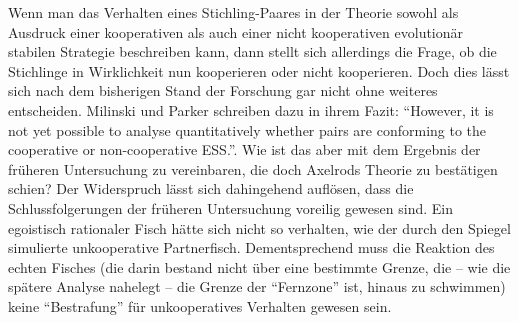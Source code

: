 \documentclass[12pt,a4paper,ngerman]{article}
\begin{document}
Wenn man das Verhalten eines Stichling-Paares in der Theorie sowohl
als Ausdruck einer kooperativen als auch einer nicht kooperativen
evolutionär stabilen Strategie beschreiben kann, dann stellt sich
allerdings die Frage, ob die Stichlinge in Wirklichkeit nun
kooperieren oder nicht kooperieren. Doch dies lässt sich nach dem
bisherigen Stand der Forschung gar nicht ohne weiteres
entscheiden. Milinski und Parker schreiben dazu in ihrem Fazit:
"`However, it is not yet possible to analyse quantitatively whether
pairs are conforming to the cooperative or non-cooperative
ESS."'\cite[S. 1245]{milinski-parker:1997}. Wie ist das aber mit dem
Ergebnis der früheren Untersuchung zu vereinbaren, die doch Axelrods
Theorie zu bestätigen schien? Der Widerspruch lässt sich dahingehend
auflösen, dass die Schlussfolgerungen der früheren Untersuchung
voreilig gewesen sind. Ein egoistisch rationaler Fisch hätte sich
nicht so verhalten, wie der durch den Spiegel simulierte unkooperative
Partnerfisch. Dementsprechend muss die Reaktion des echten Fisches
(die darin bestand nicht über eine bestimmte Grenze, die -- wie die
spätere Analyse nahelegt -- die Grenze der "`Fernzone"' ist, hinaus zu
schwimmen) keine "`Bestrafung"' für unkooperatives Verhalten gewesen
sein.
\end{document}
